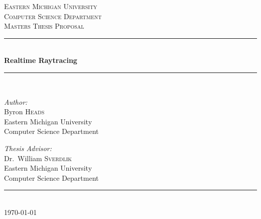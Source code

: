 \documentclass[12pt,a4paper,oneside]{article}
\newcommand{\HRule}{\rule{\linewidth}{0.5mm}}
\begin{document}
\begin{titlepage}
    \begin{center}
        \textsc{\large Eastern Michigan University}\\[1.5cm]
        \textsc{\large Computer Science Department}\\
        \textsc{\large Masters Thesis Proposal}\\[0.5cm]
        \HRule\\[0.4cm]
        { \huge \bfseries  Realtime Raytracing }\\[0.4cm]
        \HRule\\[1.5cm]

        \begin{minipage}{0.45\textwidth}
            \begin{flushleft} \large
                \emph{Author:}\\
                Byron \textsc{Heads} \\
                \small Eastern Michigan University\\
                \small Computer Science Department \\
            \end{flushleft}
        \end{minipage}
        \begin{minipage}{0.45\textwidth}
            \begin{flushright} \large
                \emph{Thesis Advisor:} \\
                Dr.~William \textsc{Sverdlik}\\
                \small Eastern Michigan University\\
                \small Computer Science Department
            \end{flushright}
        \end{minipage}

        \vfill
    
        \HRule\\[0.5cm]
        { \large \today }
    \end{center}
\end{titlepage}

\begin{abstract}



\end{abstract}
\newpage 
\tableofcontents
\newpage 
\end{document}

